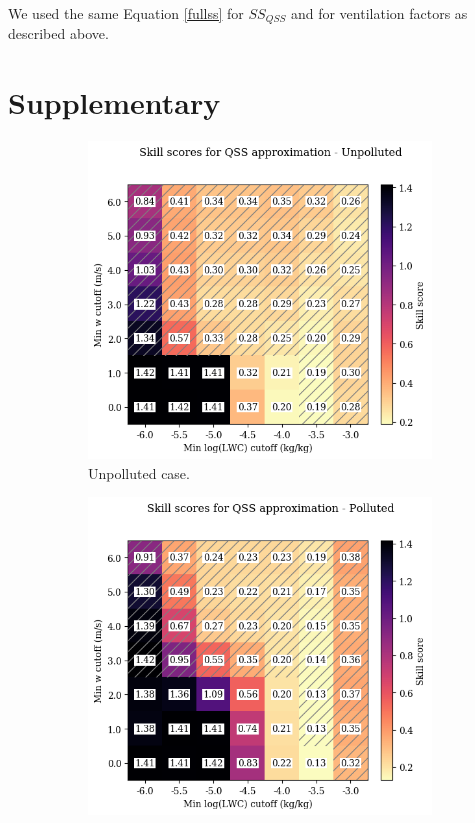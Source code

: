 \documentclass{article}
\begin{document}
We used the same Equation \ref{fullss} for $SS_{QSS}$ and for ventilation factors as described above.

\clearpage
\newpage

\section{Supplementary}

\begin{figure}[ht]
	\centering
	\begin{subfigure}{0.7\textwidth}
		\includegraphics[width=\textwidth]{wrf/filtering_criteria_separate_Unpolluted_figure.png}
		\caption{Unpolluted case.}
		\label{filtcritheatmapsepunpoll}
	\end{subfigure}
	\begin{subfigure}{0.7\textwidth}
		\includegraphics[width=\textwidth]{wrf/filtering_criteria_separate_Polluted_figure.png}

\end{subfigure}
\end{figure}
\end{document}
